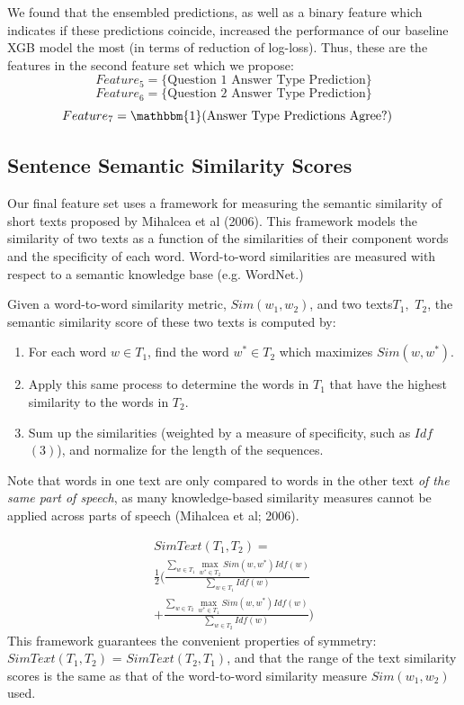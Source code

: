 \documentclass[letterpaper, 10 pt, conference]{ieeeconf}  %
\DeclareMathOperator*{\maxU}{max}
\begin{document}
We found that the ensembled predictions, as well as a binary feature which indicates if these predictions coincide, increased the performance of our baseline XGB model the most (in terms of reduction of log-loss). Thus, these are the features in the second feature set which we propose: 
$$
Feature_5 = \text{\{Question 1 Answer Type Prediction\}}
$$
$$
Feature_6 = \text{\{Question 2 Answer Type Prediction\}}
$$
$$
Feature_7 = \mathbbm{1}(\text{Answer Type Predictions Agree?})\quad
$$
\subsection{Sentence Semantic Similarity Scores}

Our final feature set uses a framework for measuring the semantic similarity of short texts proposed by Mihalcea et al (2006). This framework models the similarity of two texts as a function of the similarities of their component words and the specificity of each word. Word-to-word similarities are measured with respect to a semantic knowledge base (e.g. WordNet.)

Given a word-to-word similarity metric, $Sim(w_1, w_2)$, and two texts\footnotemark[3] $T_1,$ $T_2$, the semantic similarity score of these two texts is computed by:
\begin{enumerate}
\item For each word $w \in T_1$, find the word $w^* \in T_2$ which maximizes $Sim(w, w^*)$.
\item Apply this same process to determine the words in $T_1$ that have the highest similarity to the words in $T_2$. 
\item Sum up the similarities (weighted by a measure of specificity, such as $Idf$ $(3)$), and normalize for the length of the sequences. 
\end{enumerate}
Note that words in one text are only compared to words in the other text \emph{of the same part of speech}, as many knowledge-based similarity measures cannot be applied across parts of speech (Mihalcea et al; 2006).

\begin{gather*} \tag{8}
SimText(T_1,T_2) = \\ \frac{1}{2}\Big( \frac{\sum_{w \in T_1}{\maxU_{w^* \in T_2}Sim(w,w^*)Idf(w)}}{\sum_{w \in T_1}Idf(w)} \\ + \frac{\sum_{w \in T_2}{\maxU_{w^* \in T_1}Sim(w,w^*)Idf(w)}}{\sum_{w \in T_2}Idf(w)} \Big)
\end{gather*}
This framework guarantees the convenient properties of symmetry: $SimText(T_1, T_2)$ = $SimText(T_2, T_1)$, and that the range of the text similarity scores is the same as that of the word-to-word similarity measure  $Sim(w_1, w_2)$ used. 
\end{document}

